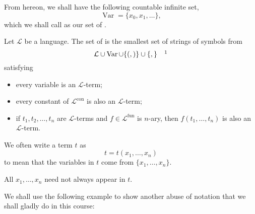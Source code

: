 \documentclass[notoc,notitlepage]{tufte-book}
\DeclareMathOperator{\Var}{Var }
\DeclareMathOperator{\con}{con}
\DeclareMathOperator{\fun}{fun}
\begin{document}
From hereon, we shall have the following countable infinite set,
\begin{equation*}
  \Var = \{ x_0, x_1, \ldots \},
\end{equation*}
which we shall call as our set of .

\begin{defn}\label{defn:l_terms}
  Let $\mathcal{L}$ be a language. The set of  is the smallest set of strings of symbols from
  \begin{equation*}
    \mathcal{L} \cup \Var \cup \{ (, ) \} \cup \{ , \} \quad \footnotemark
  \end{equation*}
   satisfying
  \begin{itemize}
    \item every variable is an $\mathcal{L}$-term;
    \item every constant of $\mathcal{L}^{\con}$ is also an $\mathcal{L}$-term;
    \item {}if $t_1, t_2, \ldots, t_n$ are $\mathcal{L}$-terms and $f \in \mathcal{L}^{\fun}$ is $n$-ary, then $f(t_1, \ldots, t_n)$ is also an $\mathcal{L}$-term.
  \end{itemize}
  We often write a term $t$ as
  \begin{equation*}
    t = t(x_1, \ldots, x_n)
  \end{equation*}
  to mean that the variables in $t$ come from $\{ x_1, \ldots, x_n \}$.
\end{defn}

\begin{remark}
  All $x_1, \ldots, x_n$ need not always appear in $t$.
\end{remark}

We shall use the following example to show another abuse of notation that we shall gladly do in this course:
\end{document}
